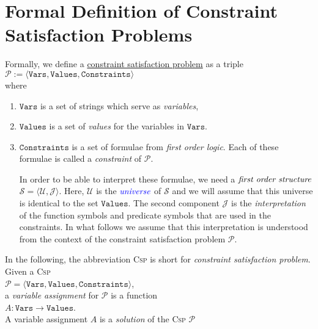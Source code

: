 \section{Formal Definition of Constraint Satisfaction Problems}
Formally, we define a 
\href{https://en.wikipedia.org/wiki/Constraint_satisfaction_problem}{constraint satisfaction problem} as a triple
\\[0.2cm]
\hspace*{1.3cm}
$\mathcal{P} := \langle \mathtt{Vars}, \mathtt{Values}, \mathtt{Constraints} \rangle$
\\[0.2cm]
where
\begin{enumerate}
\item $\mathtt{Vars}$ is a set of strings which serve as \emph{variables},
\item $\mathtt{Values}$ is a set of \emph{values} for the variables in $\mathtt{Vars}$.
\item $\mathtt{Constraints}$ is a set of formulae from \emph{\color{blue}first order logic}.  Each of these formulae is
      called a \emph{\color{blue}constraint} of $\mathcal{P}$.

      In order to be able to interpret these formulae, we need a $\emph{first order structure}$ $\mathcal{S} = \langle \mathcal{U}, \mathcal{J} \rangle$.  
      Here, $\mathcal{U}$ is the $\emph{\color{blue}universe}$ of $\mathcal{S}$ and we will assume that this
      universe is identical to the set $\mathtt{Values}$. The second component $\mathcal{J}$ is the
      \emph{\color{blue}interpretation} of the function symbols and predicate symbols that are used in the 
      constraints.  In what follows we assume that this interpretation is understood from the context of the
      constraint satisfaction problem $\mathcal{P}$.
\end{enumerate}
In the following, the abbreviation \textsc{Csp} is short for \emph{\color{blue}constraint satisfaction problem}.
Given a \textsc{Csp}
\\[0.2cm]
\hspace*{1.3cm}
 $\mathcal{P} = \langle \mathtt{Vars}, \mathtt{Values}, \mathtt{Constraints} \rangle$, 
\\[0.2cm]
a \emph{\color{blue}variable assignment} for $\mathcal{P}$ is a function
\\[0.2cm]
\hspace*{1.3cm}
$A: \mathtt{Vars} \rightarrow \mathtt{Values}$.
\\[0.2cm]
A variable assignment $A$ is a \emph{\color{blue}solution} of the \textsc{Csp} $\mathcal{P}$ 
